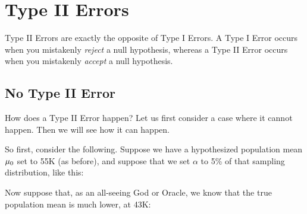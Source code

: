 \documentclass[../../../main.tex]{subfiles}
\begin{document}
\chapter{Type II Errors}


Type II Errors are exactly the opposite of Type I Errors. A Type I Error occurs when you mistakenly \emph{reject} a null hypothesis, whereas a Type II Error occurs when you mistakenly \emph{accept} a null hypothesis.


\section{No Type II Error}

How does a Type II Error happen? Let us first consider a case where it cannot happen. Then we will see how it can happen. 

So first, consider the following. Suppose we have a hypothesized population mean $\HypPopMean/$ set to 55K (as before), and suppose that we set $\alpha$ to 5\% of that sampling distribution, like this:

\begin{center}
\end{center}

\noindent
Now suppose that, as an all-seeing God or Oracle, we know that the true population mean is much lower, at 43K:
\end{document}
